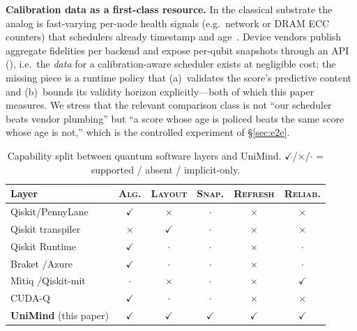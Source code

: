 \documentclass[journal,10pt,twocolumn]{IEEEtran}
\begin{document}
\textbf{Calibration data as a first-class resource.} In the classical substrate the analog is fast-varying per-node
health signals (e.g.\ network or DRAM ECC counters) that schedulers already timestamp and age~\cite{lao2022timing}.
Device vendors publish aggregate fidelities per backend and expose per-qubit snapshots through an API
(\cite{ibmcalib}), i.e.\ the \emph{data} for a calibration-aware scheduler exists at negligible cost; the missing
piece is a runtime policy that (a)~validates the score's predictive content and (b)~bounds its validity horizon
explicitly---both of which this paper measures. We stress that the relevant comparison class is not ``our
scheduler beats vendor plumbing'' but ``a score whose age is policed beats the same score whose age is not,'' which
is the controlled experiment of \S\ref{sec:e2e}.

\begin{table}[t]
\caption{Capability split between quantum software layers and UniMind. $\checkmark$/$\times$/$\cdot$ =
supported / absent / implicit-only.}
\label{tab:sys}
\centering
\footnotesize
\setlength{\tabcolsep}{3pt}
\begin{tabular}{@{}lccccc@{}}
\toprule
Layer & \textsc{Alg.} & \textsc{Layout} & \textsc{Snap.} & \textsc{Refresh} & \textsc{Reliab.}\\
\midrule
Qiskit/PennyLane \cite{qiskit,berholm2018} & $\checkmark$ & $\times$ & $\cdot$ & $\times$ & $\times$\\
Qiskit transpiler \cite{li2019sabre} & $\times$ & $\checkmark$ & $\cdot$ & $\times$ & $\times$\\
Qiskit Runtime \cite{ibmrtime} & $\checkmark$ & $\cdot$ & $\cdot$ & $\times$ & $\cdot$\\
Braket \cite{braket}/Azure \cite{azureq} & $\checkmark$ & $\cdot$ & $\cdot$ & $\times$ & $\cdot$\\
Mitiq \cite{msp2020}/Qiskit-mit \cite{nation2023} & $\cdot$ & $\times$ & $\cdot$ & $\times$ & $\checkmark$\\
CUDA-Q \cite{cuquantum} & $\checkmark$ & $\cdot$ & $\cdot$ & $\times$ & $\times$\\
\midrule
\textbf{UniMind} (this paper) & $\checkmark$ & $\checkmark$ & $\checkmark$ & $\checkmark$ & $\checkmark$\\
\bottomrule
\end{tabular}
\end{table}

\end{document}
